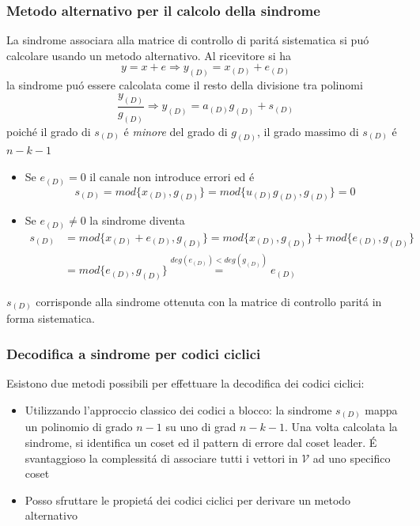         \subsubsection{Metodo alternativo per il calcolo della sindrome}
            La sindrome associara alla matrice di controllo di paritá sistematica si puó calcolare
            usando un metodo alternativo. Al ricevitore si ha 
            \[
                y=x+e\Rightarrow y_{(D)} = x_{(D)}+e_{(D)}
            \]
            la sindrome puó essere calcolata come il resto della divisione tra polinomi
            \[
                \frac{y_{(D)}}{g_{(D)}}\Rightarrow y_{(D)} = a_{(D)}g_{(D)} + s_{(D)} 
            \]
            poiché il grado di $s_{(D)}$ é \emph{minore} del grado di $g_{(D)}$, il grado massimo di $s_{(D)}$ é $n-k-1$
            \begin{itemize}
                \item {
                    Se $e_{(D)} = 0$ il canale non introduce errori ed é 
                    \[
                        s_{(D)} = mod\{x_{(D)},g_{(D)}\} =mod\{u_{(D)}g_{(D)},g_{(D)}\} = 0
                    \]
                }
                \item {
                    Se $e_{(D)} \neq 0$ la sindrome diventa
                    \begin{align}
                        s_{(D)} &= mod\{x_{(D)}+e_{(D)},g_{(D)}\} = mod\{x_{(D)},g_{(D)}\}+mod\{e_{(D)},g_{(D)}\} \nonumber \\
                                &= mod\{e_{(D)},g_{(D)}\} \overset{deg(e_{(D)})<deg(g_{(D)})}{=} e_{(D)}\nonumber 
                    \end{align}
                }
            \end{itemize}
            $s_{(D)}$ corrisponde alla sindrome ottenuta con la matrice di controllo paritá in forma sistematica.
        \subsubsection{Decodifica a sindrome per codici ciclici}
            Esistono due metodi possibili per effettuare la decodifica dei codici ciclici:
            \begin{itemize}
                \item {Utilizzando l'approccio classico dei codici a blocco: la sindrome $s_{(D)}$ mappa un polinomio di
                    grado $n-1$ su uno di grad $n-k-1$. Una volta calcolata la sindrome, si identifica un coset ed il pattern di errore 
                    dal coset leader. É svantaggioso la complessitá di associare tutti i vettori in $\mathcal{V}$ ad uno specifico
                    coset
                }
                \item {Posso sfruttare le propietá dei codici ciclici per derivare un metodo alternativo}
            \end{itemize}
